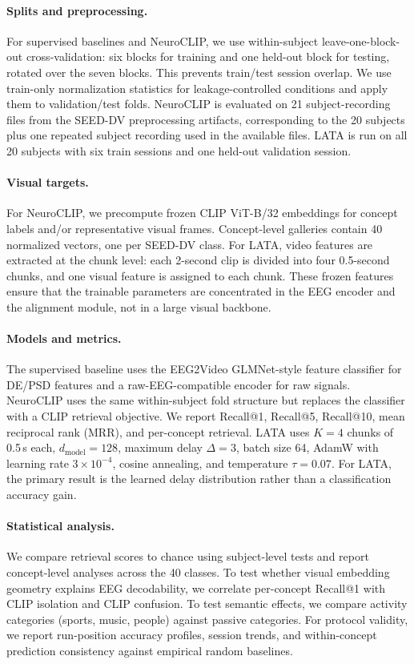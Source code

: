 \documentclass{article}
\begin{document}
\paragraph{Splits and preprocessing.}
For supervised baselines and NeuroCLIP, we use within-subject leave-one-block-out
cross-validation: six blocks for training and one held-out block for testing,
rotated over the seven blocks. This prevents train/test session overlap. We use
train-only normalization statistics for leakage-controlled conditions and apply
them to validation/test folds. NeuroCLIP is evaluated on 21 subject-recording
files from the SEED-DV preprocessing artifacts, corresponding to the 20 subjects
plus one repeated subject recording used in the available files. LATA is run on
all 20 subjects with six train sessions and one held-out validation session.

\paragraph{Visual targets.}
For NeuroCLIP, we precompute frozen CLIP ViT-B/32 embeddings for concept labels
and/or representative visual frames. Concept-level galleries contain 40
normalized vectors, one per SEED-DV class. For LATA, video features are extracted
at the chunk level: each 2-second clip is divided into four 0.5-second chunks,
and one visual feature is assigned to each chunk. These frozen features ensure
that the trainable parameters are concentrated in the EEG encoder and the
alignment module, not in a large visual backbone.

\paragraph{Models and metrics.}
The supervised baseline uses the EEG2Video GLMNet-style feature classifier for
DE/PSD features and a raw-EEG-compatible encoder for raw signals. NeuroCLIP uses
the same within-subject fold structure but replaces the classifier with a CLIP
retrieval objective. We report Recall@1, Recall@5, Recall@10, mean reciprocal
rank (MRR), and per-concept retrieval. LATA uses $K{=}4$ chunks of 0.5\,s each,
$d_{\mathrm{model}}{=}128$, maximum delay $\Delta{=}3$, batch size 64, AdamW
with learning rate $3\times10^{-4}$, cosine annealing, and temperature
$\tau{=}0.07$. For LATA, the primary result is the learned delay distribution
rather than a classification accuracy gain.

\paragraph{Statistical analysis.}
We compare retrieval scores to chance using subject-level tests and report
concept-level analyses across the 40 classes. To test whether visual embedding
geometry explains EEG decodability, we correlate per-concept Recall@1 with CLIP
isolation and CLIP confusion. To test semantic effects, we compare activity
categories (sports, music, people) against passive categories. For protocol
validity, we report run-position accuracy profiles, session trends, and
within-concept prediction consistency against empirical random baselines.
\end{document}

